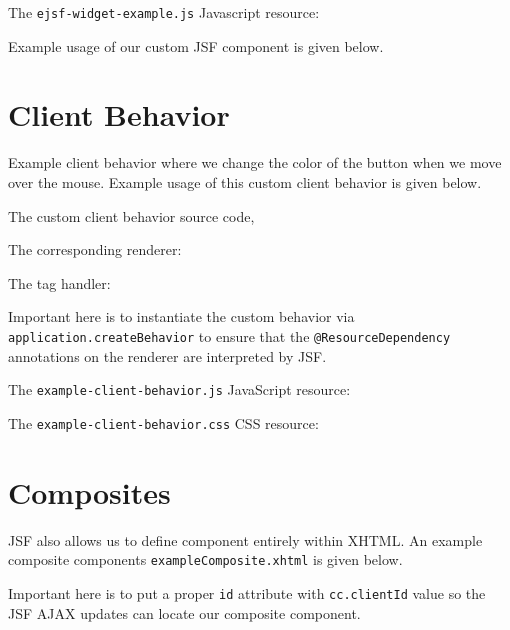 The \texttt{ejsf-widget-example.js} Javascript resource:


Example usage of our custom JSF component is given below.


\section{Client Behavior}
Example client behavior where we change the color of the button when we move over the mouse.
Example usage of this custom client behavior is given below.


The custom client behavior source code,


The corresponding renderer:


The tag handler:

Important here is to instantiate the custom behavior via \texttt{application.createBehavior} to ensure that the \texttt{@ResourceDependency} annotations on the renderer are interpreted by JSF.

The \texttt{example-client-behavior.js} JavaScript resource:


The \texttt{example-client-behavior.css} CSS resource:


\section{Composites}
JSF also allows us to define component entirely within XHTML.
An example composite components \texttt{exampleComposite.xhtml} is given below.

Important here is to put a proper \texttt{id} attribute with \texttt{cc.clientId} value so the JSF AJAX updates can locate our composite component.

